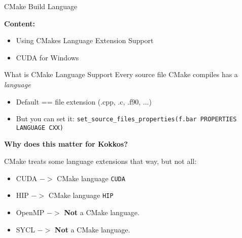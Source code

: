 

\begin{frame}[fragile]{}

  {\Huge CMake Build Language}

  \vspace{10pt}

  \textbf{Content:}
  \begin{itemize}
    \item {Using CMakes Language Extension Support}
    \item {CUDA for Windows}
  \end{itemize}

  \vspace{-20pt}

\end{frame}


\begin{frame}[fragile]{What is CMake Language Support}
   Every source file CMake compiles has a \textit{language}

   \begin{itemize}
     \item {Default == file extension (.cpp, .c, .f90, ...)}
     \item {But you can set it: \texttt{set\_source\_files\_properties(f.bar PROPERTIES LANGUAGE CXX)}}
   \end{itemize}

   \textbf{Why does this matter for Kokkos?}

   \vspace{10pt}
   CMake treats some language extensions that way, but not all:
   
   \begin{itemize}
     \item {CUDA $->$ CMake language \texttt{CUDA}}
     \item {HIP $->$ CMake language \texttt{HIP}}
     \item {OpenMP $->$ \textbf{Not} a CMake language.}
     \item {SYCL $->$ \textbf{Not} a CMake language.}
   \end{itemize}
\end{frame}

